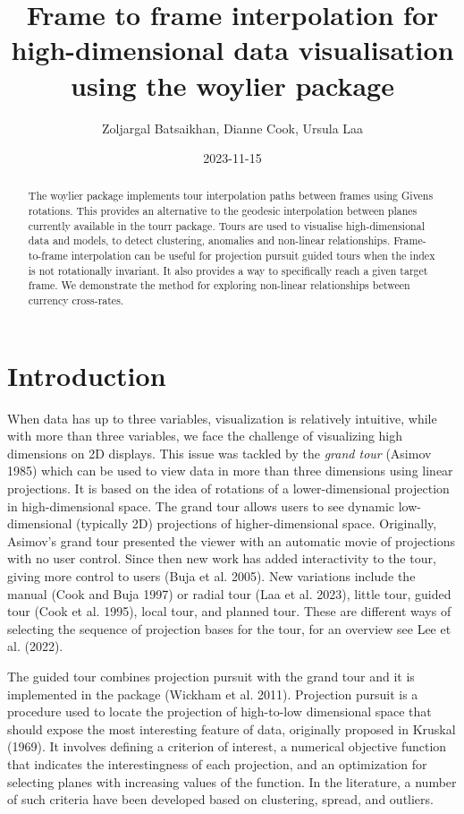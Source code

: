 \documentclass[
]{article}
\title{Frame to frame interpolation for high-dimensional data
visualisation using the woylier package}
\author{Zoljargal Batsaikhan, Dianne Cook, Ursula Laa}
\date{2023-11-15}
\begin{document}
\maketitle
\begin{abstract}
The woylier package implements tour interpolation paths between frames
using Givens rotations. This provides an alternative to the geodesic
interpolation between planes currently available in the tourr package.
Tours are used to visualise high-dimensional data and models, to detect
clustering, anomalies and non-linear relationships. Frame-to-frame
interpolation can be useful for projection pursuit guided tours when the
index is not rotationally invariant. It also provides a way to
specifically reach a given target frame. We demonstrate the method for
exploring non-linear relationships between currency cross-rates.
\end{abstract}

\hypertarget{introduction}{%
\section{Introduction}\label{introduction}}

When data has up to three variables, visualization is relatively
intuitive, while with more than three variables, we face the challenge
of visualizing high dimensions on 2D displays. This issue was tackled by
the \emph{grand tour} (Asimov 1985) which can be used to view data in
more than three dimensions using linear projections. It is based on the
idea of rotations of a lower-dimensional projection in high-dimensional
space. The grand tour allows users to see dynamic low-dimensional
(typically 2D) projections of higher-dimensional space. Originally,
Asimov's grand tour presented the viewer with an automatic movie of
projections with no user control. Since then new work has added
interactivity to the tour, giving more control to users (Buja et al.
2005). New variations include the manual (Cook and Buja 1997) or radial
tour (Laa et al. 2023), little tour, guided tour (Cook et al. 1995),
local tour, and planned tour. These are different ways of selecting the
sequence of projection bases for the tour, for an overview see Lee et
al. (2022).

The guided tour combines projection pursuit with the grand tour and it
is implemented in the  package (Wickham et al. 2011).
Projection pursuit is a procedure used to locate the projection of
high-to-low dimensional space that should expose the most interesting
feature of data, originally proposed in Kruskal (1969). It involves
defining a criterion of interest, a numerical objective function that
indicates the interestingness of each projection, and an optimization
for selecting planes with increasing values of the function. In the
literature, a number of such criteria have been developed based on
clustering, spread, and outliers.
\end{document}

